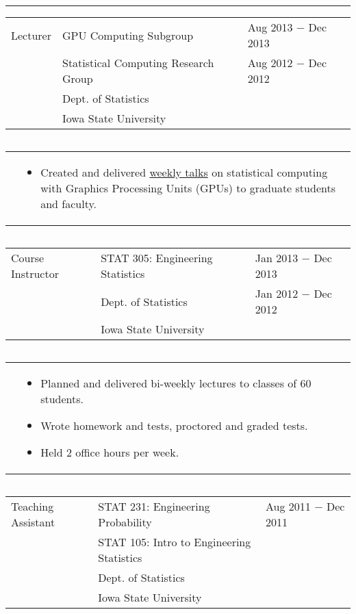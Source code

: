 \documentclass{article}
\newcommand{\q}{$\quad$ \newline}
\newcommand{\vl}{4.25}
\newcommand{\wl}{8.4}
\newcommand{\ww}{13}
\newcommand{\myrule}{\noindent \rule{\textwidth}{1pt}}
\begin{document}


\myrule
 
\noindent \begin{tabular}{@{}p{\vl cm}p{\wl cm}l@{}}
Lecturer & GPU Computing Subgroup & Aug 2013 $-$ Dec 2013 \\
& Statistical Computing Research Group & Aug 2012 $-$ Dec 2012 \\
& Dept. of Statistics & \\
& Iowa State University & 
\end{tabular} \q 
   
 \noindent \begin{tabular}{@{}p{\vl cm}p{\ww cm}@{}}
& \begin{itemize}
\item Created and delivered \href{http://will-landau.com/gpu}{weekly talks} on statistical computing with Graphics Processing Units (GPUs) to graduate students and faculty.
\end{itemize}
\end{tabular} \q 


\noindent \begin{tabular}{@{}p{\vl cm}p{\wl cm}l@{}}
Course Instructor & STAT 305: Engineering Statistics & Jan 2013 $-$ Dec 2013 \\
& Dept. of Statistics & Jan 2012 $-$ Dec 2012 \\
& Iowa State University & \\
\end{tabular} \q 

\noindent \begin{tabular}{@{}p{\vl cm}p{\ww cm}@{}}
& \begin{itemize}
\item Planned and delivered bi-weekly lectures to classes of 60 students. 
\item Wrote homework and tests, proctored and graded tests. 
\item Held 2 office hours per week. 
\end{itemize}
\end{tabular} \q  

\noindent \begin{tabular}{@{}p{\vl cm}p{\wl cm}l@{}}
Teaching Assistant & STAT 231: Engineering Probability & Aug 2011 $-$ Dec 2011 \\
& STAT 105: Intro to Engineering Statistics & \\
& Dept. of Statistics & \\
& Iowa State University & \\
\end{tabular} \q 
\end{document}
